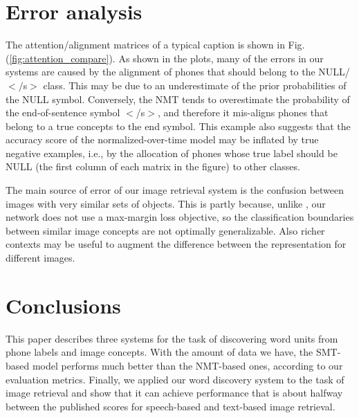 \documentclass[a4paper]{article}
\begin{document}
\section{Error analysis}
The attention/alignment matrices of a typical caption is shown in Fig. (\ref{fig:attention_compare}). As shown in the plots,
many of the errors in our systems are caused by the alignment of phones that should belong to the NULL/$</$s$>$ class. 
This may be due to an underestimate of the prior probabilities of the NULL symbol.
Conversely, the NMT tends to overestimate the probability of the end-of-sentence symbol $<$/s$>$,
and therefore it mis-aligns phones that belong to a true concepts to the end symbol.
This example also suggests that
the accuracy score of the normalized-over-time model may be inflated by true negative examples,
i.e., by the allocation of phones whose true label should be NULL (the first column of each matrix
in the figure) to other classes.

The main source of error of our image retrieval system is the confusion between images with very similar sets of objects.
This is partly because, unlike \cite{Karpathy14}, our network does not use
a max-margin loss objective,
so the classification boundaries between similar image concepts are not optimally generalizable.
Also richer contexts may be useful to augment the difference between the representation for different images. 

\section{Conclusions}
This paper describes three systems for the 
task of discovering word units from phone labels and image concepts.
With the amount of data we have, the SMT-based model performs much better than the NMT-based ones, according to our evaluation metrics.
Finally, we applied our word discovery system to the task of image retrieval and show that it can achieve  performance that is about halfway between the published scores for speech-based and text-based image retrieval.
\end{document}
